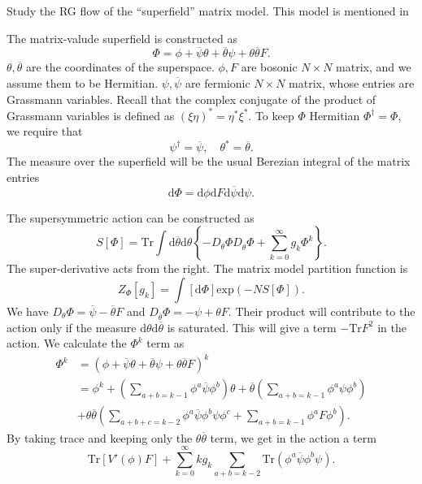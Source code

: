 Study the RG flow of the ``superfield'' matrix model.
This model is mentioned in

The matrix-valude superfield is constructed as
\begin{equation}
\Phi = \phi + \overline{\psi} \theta + \overline{\theta} \psi + \theta \overline{\theta} F.	
\end{equation}
$\theta,\overline{\theta}$ are the coordinates of the superspace.
$\phi,F$ are bosonic $N\times N$ matrix, and we assume them to be Hermitian.
$\psi,\overline{\psi}$ are fermionic $N\times N$ matrix, whose entries are Grassmann variables.
Recall that the complex conjugate of the product of Grassmann variables is defined as $ (\xi \eta)^* = \eta^* \xi^*$.
To keep $\Phi$ Hermitian $\Phi^\dagger = \Phi$, we require that
\[
	\psi^\dagger  = \overline{\psi},\quad \theta^* = \overline{\theta}
.\] 
The measure over the superfield will be the usual Berezian integral of the matrix entries
\begin{equation}
\mathrm{d}\Phi = \mathrm{d}\phi \mathrm{d}F \mathrm{d}\overline{\psi} \mathrm{d}\psi.	
\end{equation}

The supersymmetric action can be constructed as
\begin{equation}
	S[\Phi] =\mathrm{Tr} \int \mathrm{d}\overline{\theta} \mathrm{d}\theta
	\left\{ - D_\theta \Phi D_{\overline{\theta}} \Phi + \sum_{k=0}^\infty g_k \Phi^k \right\}.
\end{equation}
The super-derivative acts from the right.
The matrix model partition function is
\begin{equation}
	Z_\Phi [g_k] = \int [\mathrm{d}\Phi] \mathrm{exp} \left( - N S[\Phi] \right) 	.
\end{equation}
We have $D_\theta \Phi = \overline{\psi} - \overline{\theta} F$ and $D_{\overline{\theta}} \Phi = -\psi + \theta F$.
Their product will contribute to the action only if the measure $\mathrm{d}\theta \mathrm{d}\overline{\theta}$ is saturated.
This will give a term $-\mathrm{Tr}F^2$ in the action.
We calculate the $\Phi^k$ term as
\begin{align*}
	\Phi^k &= \left( \phi + \overline{\psi}\theta + \overline{\theta} \psi + \theta \overline{\theta} F \right)^k \\
		   &= \phi^k + \left( \sum_{a+b=k-1} \phi^a \overline{\psi} \phi^b \right) \theta + \overline{\theta} \left( \sum_{a+b=k-1} \phi^a \psi \phi^b\right)  \\
		   &+ \theta \overline{\theta}\left(\sum_{a+b+c=k-2} \phi^a \overline{\psi} \phi^b \psi \phi^c + \sum_{a+b=k-1}\phi^a F \phi^b\right).
\end{align*}
By taking trace and keeping only the $\theta \overline{\theta}$ term, we get in the action a term
\[
	 \mathrm{Tr}[V'(\phi) F] + \sum_{k=0}^\infty k g_k \sum_{a+b=k-2} \mathrm{Tr}(\phi^a \overline{\psi} \phi^b \psi)
.\] 

